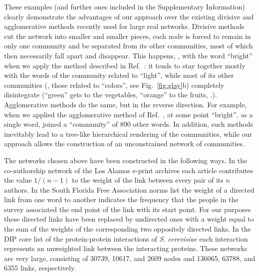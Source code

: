 \documentclass[11pt,a4paper]{article}
\begin{document}
{\corr
These examples (and further ones included in the 
Supplementary Information) clearly
demonstrate the advantages of our approach over the existing
divisive and agglomerative methods recently used for large real networks.
Divisive methods cut the network
into smaller and smaller pieces, each node is forced to remain
in only one community and be separated from its other communities,
most of which then necessarily fall apart and disappear.
This happens, \eg, with the word ``bright'' when we apply
the method described in Ref.\
\cite{gn-pnas}:
it tends to stay together mostly with the words of the community
related to ``light'', while most of its other communities
(\eg, those related to ``colors'', see Fig.~\ref{fig:glay}b)
completely disintegrate
(``green'' gets to the vegetables, ``orange'' to the fruits, \etc.).
%
Agglomerative methods do the same, but in the reverse direction.
For example, when we applied the agglomerative method of Ref.\
\cite{newman-pre},
at some point ``bright'', as a single word, joined a 
``community'' of 890 other words.
%
In addition, such methods inevitably lead to a tree-like hierarchical
rendering of the communities, while our approach allows the
construction of an unconstrained network of communities.}


The networks chosen above have been constructed in the following ways.
%
In the co-authorship network of the Los Alamos e-print archives
\cite {cond-mat}
each article contributes the value $1/(n-1)$ to the weight of the
link between every pair of its $n$ authors.
%
In the South Florida Free Association norms list
\cite{nelson}
the weight of a directed link from one word to another indicates
the frequency that the people in the survey associated the end point of
the link with its start point. For our purposes these directed
links have been replaced by undirected ones with a weight equal
to the sum of the weights of the corresponding two oppositely directed
links.
%
In the DIP core
list of the protein-protein interactions of \textit{S. cerevisiae}
\cite{dip}
each interaction represents an unweighted link between the
interacting proteins.
%
These networks are very large, consisting of
 30739, 10617, and 2609 nodes and
136065, 63788, and 6355 links, respectively.
\end{document}
